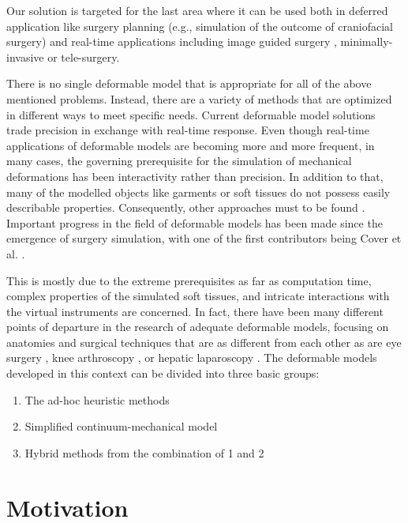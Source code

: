 Our solution is targeted for the last area where it can be used both in deferred application like surgery planning (e.g., simulation of the 
outcome of craniofacial surgery) \cite{bro1995modelling, keeve1996craniofacial} and real-time applications 
including image guided surgery \cite{Szekely2000}, minimally-invasive or tele-surgery. 


There is no single deformable model that is appropriate for all of the above mentioned 
problems. Instead, there are a variety of methods that are optimized in different ways to meet specific 
needs. 
Current deformable model solutions trade precision in exchange with real-time response.
Even though real-time applications of deformable models are becoming more and more frequent, 
in many cases, the governing prerequisite for the simulation of 
mechanical deformations has been interactivity rather than precision. In addition to that, many of the modelled objects like garments or soft 
tissues do not possess easily describable properties. Consequently, other approaches must to be found 
\cite{bro1998finite}. Important progress in the field of deformable models has been made since the emergence of surgery 
simulation, with one of the first contributors being Cover et al. \cite{cover1993interactively}. 


This is mostly due to the extreme prerequisites 
as far as computation time, complex properties of the simulated soft tissues, and intricate interactions with the virtual instruments are concerned. 
In fact, there have been many different points of departure in the research of adequate deformable models, focusing on anatomies and surgical techniques 
that are as different from each other as are eye surgery \cite{cai2001parametric, sagar1994virtual}, knee arthroscopy \cite{gibson1997simulating, 
hoffman1998commercially}, or hepatic laparoscopy \cite{cotin1999real}. The deformable models developed in this context can be divided into three basic groups: 

\begin{enumerate}
 \item The ad-hoc heuristic methods
 \item Simplified continuum-mechanical model
 \item Hybrid methods from the combination of 1 and 2
\end{enumerate}



\section{Motivation}

